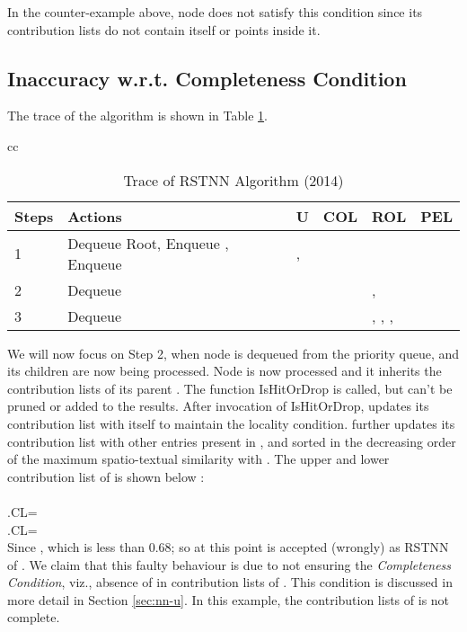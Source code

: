 \documentclass[prodmode,letterpaper]{acmsmall}
\newcommand{\rstknn}{RSTNN\xspace}
\begin{document}
In the counter-example above, node  does not satisfy this condition
since its contribution lists do not contain itself or points inside it.

\subsection{Inaccuracy w.r.t. Completeness Condition}\label{subsec:completeness}
The trace of the algorithm \cite{lu2014efficient} is shown in Table \ref{Tab:rstknn_algo_2014}.
\begin{table}[!htb]
	\begin{tabular}{cc}\noindent\begin{minipage}[t]{\linewidth}
			\begin{center}
				\caption{Trace of \rstknn Algorithm (2014) \label{Tab:rstknn_algo_2014}}
				\begin{tabular}{|l | p{4cm} | l | l | l | l |}
					\hline
					\bfseries{Steps} & \bfseries{Actions} & \bfseries{U}& \textbf{COL} & \textbf{ROL} & \textbf{PEL} \\
					\hline
					1 & Dequeue Root, Enqueue , Enqueue  & ,  &&  & \\ 
					\hline
					2 & Dequeue  &  &  & ,  & \\
					\hline
					3 & Dequeue  &  &  & , , ,  & \\
					\hline
				\end{tabular}
			\end{center}
\end{minipage}
	\end{tabular}
\end{table} 

We will now focus on Step 2, when node  is dequeued from the priority queue,
and its children are now being processed.
Node  is now processed and it inherits the contribution lists of its parent . The function IsHitOrDrop is called, but   can't be pruned or added to the results. After invocation of IsHitOrDrop,  updates its contribution list with itself to maintain the locality condition.  further updates its contribution list with other entries present in ,  and  sorted in the decreasing order of the maximum spatio-textual similarity with . The upper and lower contribution list of  is shown below :\\ \\
.CL=\\
.CL=\\
Since , which is less than 0.68; so at this point 
 is accepted (wrongly) as \rstknn of .
We claim that this faulty
behaviour is due to not ensuring the {\em Completeness Condition}, viz.,
absence of  in contribution lists of .
This condition is discussed in more detail in Section \ref{sec:nn-u}. In this
example, the contribution lists of  is not complete.
\end{document}
